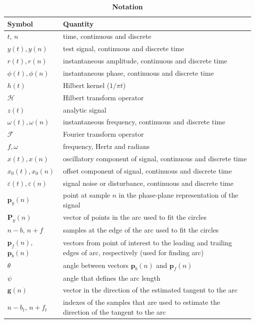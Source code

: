 \documentclass[11pt,draftcls,onecolumn]{IEEEtran}
\begin{document}
\begin{table}[!ht]
\caption{
\bf{Notation}}
\begin{tabular}{|l|l|}
	\hline
	\textbf{Symbol} & \textbf{Quantity} \\ \hline
	$t$, $n$ & time, continuous and discrete \\ \hline
	$y(t),y(n)$ & test signal, continuous and discrete time \\ \hline
	$r(t), r(n)$ & instantaneous amplitude, continuous and discrete time \\ \hline
	$\phi(t),\phi(n)$ & instantaneous phase, continuous and discrete time \\ \hline
	$h(t)$ & Hilbert kernel ($1/\pi t$) \\ \hline
	$\mathcal{H}$ & Hilbert transform operator \\ \hline
	$z(t)$ & analytic signal \\ \hline
	$\omega(t),\omega(n)$ & instantaneous frequency, continuous and discrete time \\ \hline
	$\mathcal{F}$ & Fourier transform operator \\ \hline
	$f,\omega$ & frequency, Hertz and radians \\ \hline
	$x(t),x(n)$ & oscillatory component of signal, continuous and discrete time \\ \hline
	$x_0(t),x_0(n)$ & offset component of signal, continuous and discrete time \\ \hline
	$\varepsilon(t),\varepsilon(n)$ & signal noise or disturbance, continuous and discrete time \\ \hline	
	$\mathbf{p}_y(n)$ & point at sample $n$ in the phase-plane representation of the signal \\ \hline
	$\mathbf{P}_y(n)$ & vector of points in the arc used to fit the circles \\ \hline
	$n-b$, $n+f$ & samples at the edge of the arc used to fit the circles \\ \hline 
	$\mathbf{p}_f(n)$, $\mathbf{p}_b(n)$ & vectors from point of interest to the leading and trailing edges of arc, respectively (used for finding arc) \\ \hline
	$\theta$ & angle between vectors $\mathbf{p}_b(n)$ and $\mathbf{p}_f(n)$ \\ \hline
	$\psi$ & angle that defines the arc length \\ \hline
	$\mathbf{g}(n)$ & vector in the direction of the estimated tangent to the arc \\ \hline
	$n-b_t$, $n+f_t$ & indexes of the samples that are used to estimate the direction of the tangent to the arc \\ \hline

\end{tabular}
\end{table}
\end{document}
